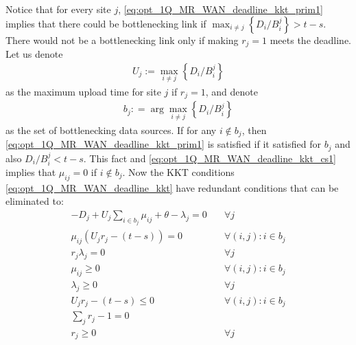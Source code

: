 Notice that for every site $j$, \eqref{eq:opt_1Q_MR_WAN_deadline_kkt_prim1} implies that there could be bottlenecking link if $\max_{i\neq j}\left\{D_i/B_i^j\right\}>t-s$.
There would not be a bottlenecking link only if making $r_j=1$ meets the deadline.
Let us denote
\begin{align}
	U_j := \max_{i\neq j}\left\{D_i/B_i^j\right\}
\end{align}
as the maximum upload time for site $j$ if $r_j=1$, and denote
\begin{align}
	b_j: = \arg\max_{i\neq j}\left\{D_i/B_i^j\right\}
\end{align}
as the set of bottlenecking data sources.
If for any $i\notin b_j$, then \eqref{eq:opt_1Q_MR_WAN_deadline_kkt_prim1} is satisfied if it satisfied for $b_j$ and also $D_i/B_i^j<t-s$.
This fact and \eqref{eq:opt_1Q_MR_WAN_deadline_kkt_cs1} implies that $\mu_{ij}=0$ if $i\notin b_j$.
Now the KKT conditions \eqref{eq:opt_1Q_MR_WAN_deadline_kkt} have redundant conditions that can be eliminated to:
\begin{subequations}\label{eq:opt_1Q_MR_WAN_deadline_kkt2}
	\begin{align}
		-D_j+U_j\sum_{i\in b_j}\mu_{ij} + \theta - \lambda_j = 0 & \quad \forall j \label{eq:opt_1Q_MR_WAN_deadline_kkt2_stat}\\
		\mu_{ij}\left(U_jr_{j} - (t - s)\right) = 0 & \quad \forall (i,j):i\in b_j \label{eq:opt_1Q_MR_WAN_deadline_kkt2_cs1}\\
		r_j\lambda_j = 0 & \quad \forall j \label{eq:opt_1Q_MR_WAN_deadline_kkt2_cs2}\\
		\mu_{ij} \geq 0 & \quad \forall (i,j):i\in b_j \label{eq:opt_1Q_MR_WAN_deadline_kkt2_dual1}\\
		\lambda_j \geq 0  & \quad \forall j \label{eq:opt_1Q_MR_WAN_deadline_kkt2_dual2}\\
		U_jr_{j} - (t - s) \leq 0  & \quad \forall (i,j):i\in b_j \label{eq:opt_1Q_MR_WAN_deadline_kkt2_prim1}\\
		\sum_{j}r_{j} - 1 = 0 & \label{eq:opt_1Q_MR_WAN_deadline_kkt2_prim2}\\
		r_{j} \geq 0 & \quad \forall j \label{eq:opt_1Q_MR_WAN_deadline_kkt2_prim3}
	\end{align}
\end{subequations}

